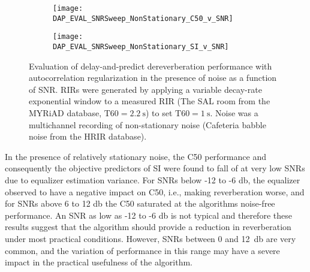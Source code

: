 \begin{figure}[H]
	\centering
	\begin{subfigure}[b]{0.47\textwidth}
		\centering
		\texttt{[image: DAP\_EVAL\_SNRSweep\_NonStationary\_C50\_v\_SNR]}
	\end{subfigure}
	\begin{subfigure}[b]{0.92\textwidth}
		\centering
		\texttt{[image: DAP\_EVAL\_SNRSweep\_NonStationary\_SI\_v\_SNR]}
	\end{subfigure}
	\caption[DAP evaluation with non-stationary noise]{Evaluation of delay-and-predict dereverberation performance with autocorrelation regularization in the presence of noise as a function of SNR. RIRs were generated by applying a variable decay-rate exponential window to a measured RIR (The SAL room from the MYRiAD database, $\mathrm{T60} = \qty{2.2}{\second}$) to set $\mathrm{T60} = \qty{1}{\second}$. Noise was a multichannel recording of non-stationary noise (Cafeteria babble noise from the HRIR database).}
	\label{fig:DAP_EVAL_SNRSweep_NonStationary}
\end{figure}

In the presence of relatively stationary noise, the C50 performance and consequently the objective predictors of SI were found to fall of at very low SNRs due to equalizer estimation variance. For SNRs below -12 to -6 \unit{\decibel}, the equalizer observed to have a negative impact on C50, i.e., making reverberation worse, and for SNRs above 6 to 12 \unit{\decibel} the C50 saturated at the algorithms noise-free performance. An SNR as low as -12 to -6 \unit{\decibel} is not typical and therefore these results suggest that the algorithm should provide a reduction in reverberation under most practical conditions. However, SNRs between 0 and \qty{12}{\decibel} are very common, and the variation of performance in this range may have a severe impact in the practical usefulness of the algorithm.

